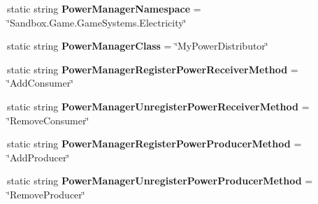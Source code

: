 \begin{DoxyCompactItemize}
\item 
\hypertarget{class_s_e_mod_a_p_i_internal_1_1_a_p_i_1_1_common_1_1_power_manager_ad0281eb504d410f445af1680447b7b97}{}static string {\bfseries Power\+Manager\+Namespace} = \char`\"{}Sandbox.\+Game.\+Game\+Systems.\+Electricity\char`\"{}\label{class_s_e_mod_a_p_i_internal_1_1_a_p_i_1_1_common_1_1_power_manager_ad0281eb504d410f445af1680447b7b97}

\item 
\hypertarget{class_s_e_mod_a_p_i_internal_1_1_a_p_i_1_1_common_1_1_power_manager_af07350d9942f92668be18ff20bf64ba1}{}static string {\bfseries Power\+Manager\+Class} = \char`\"{}My\+Power\+Distributor\char`\"{}\label{class_s_e_mod_a_p_i_internal_1_1_a_p_i_1_1_common_1_1_power_manager_af07350d9942f92668be18ff20bf64ba1}

\item 
\hypertarget{class_s_e_mod_a_p_i_internal_1_1_a_p_i_1_1_common_1_1_power_manager_aad7b59d65de0a0538f278dbd5c8af9da}{}static string {\bfseries Power\+Manager\+Register\+Power\+Receiver\+Method} = \char`\"{}Add\+Consumer\char`\"{}\label{class_s_e_mod_a_p_i_internal_1_1_a_p_i_1_1_common_1_1_power_manager_aad7b59d65de0a0538f278dbd5c8af9da}

\item 
\hypertarget{class_s_e_mod_a_p_i_internal_1_1_a_p_i_1_1_common_1_1_power_manager_af19c2511cb89a6c56fcf913c2a0151df}{}static string {\bfseries Power\+Manager\+Unregister\+Power\+Receiver\+Method} = \char`\"{}Remove\+Consumer\char`\"{}\label{class_s_e_mod_a_p_i_internal_1_1_a_p_i_1_1_common_1_1_power_manager_af19c2511cb89a6c56fcf913c2a0151df}

\item 
\hypertarget{class_s_e_mod_a_p_i_internal_1_1_a_p_i_1_1_common_1_1_power_manager_a179990901e8776b523501d410dfbd9f8}{}static string {\bfseries Power\+Manager\+Register\+Power\+Producer\+Method} = \char`\"{}Add\+Producer\char`\"{}\label{class_s_e_mod_a_p_i_internal_1_1_a_p_i_1_1_common_1_1_power_manager_a179990901e8776b523501d410dfbd9f8}

\item 
\hypertarget{class_s_e_mod_a_p_i_internal_1_1_a_p_i_1_1_common_1_1_power_manager_a9b823cd231ad00e2da28d7df4aa9b72e}{}static string {\bfseries Power\+Manager\+Unregister\+Power\+Producer\+Method} = \char`\"{}Remove\+Producer\char`\"{}\label{class_s_e_mod_a_p_i_internal_1_1_a_p_i_1_1_common_1_1_power_manager_a9b823cd231ad00e2da28d7df4aa9b72e}


\end{DoxyCompactItemize}
